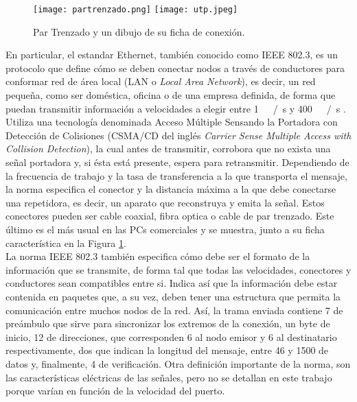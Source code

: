 \begin{figure}
	\centering
	\texttt{[image: partrenzado.png]}
	\texttt{[image: utp.jpeg]}
	\caption{Par Trenzado y un dibujo de su ficha de conexión.}
	\label{fig:utp}
\end{figure}

En particular, el estandar Ethernet, también conocido como IEEE 802.3, es un protocolo que define cómo se deben conectar nodos a través de conductores para conformar red de área local (LAN o {\it Local Area Network}), es decir, un red pequeña, como ser doméstica, oficina o de una empresa definida, de forma que puedan transmitir información a velocidades a elegir entre \SI{1}{\mega\bit\slash\second} y \SI{400}{\giga\bit\slash\second} \cite{Ethernet2018}. Utiliza una tecnología denominada Acceso Múltiple Sensando la Portadora con Detección de Colisiones (CSMA/CD del inglés {\it Carrier Sense Multiple Access with Collision Detection}), la cual antes de transmitir, corrobora que no exista una señal portadora y, si ésta está presente, espera para retransmitir. Dependiendo de la frecuencia de trabajo y la tasa de transferencia a la que transporta el mensaje, la norma especifica el conector y la distancia máxima a la que debe conectarse una repetidora, es decir, un aparato que reconstruya y emita la señal. Estos conectores pueden ser cable coaxial, fibra optica o cable de par trenzado. Este último es el más usual en las PCs comerciales y se muestra, junto a su ficha característica en la Figura \ref{fig:utp}.\\

La norma IEEE 802.3 también especifica cómo debe ser el formato de la información que se transmite, de forma tal que todas las velocidades, conectores y conductores sean compatibles entre si. Indica así que la información debe estar contenida en paquetes que, a su vez, deben tener una estructura que permita la comunicación entre muchos nodos de la red. Así, la trama enviada contiene \SI{7}{\byte} de preámbulo que sirve para sincronizar los extremos de la conexión, un byte de inicio, 12 de direcciones, que corresponden 6 al nodo emisor y 6 al destinatario respectivamente, dos que indican la longitud del mensaje, entre 46 y \SI{1500}{\byte} de datos y, finalmente, 4 de verificación. Otra definición importante de la norma, son las características eléctricas de las señales, pero no se detallan en este trabajo porque varían en función de la velocidad del puerto.\\

